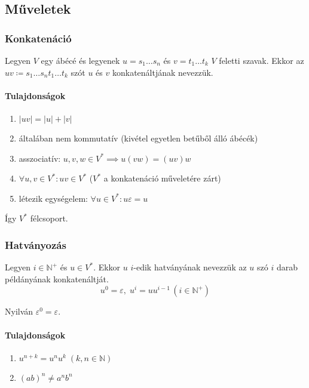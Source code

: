 \subsection{Műveletek}
\subsubsection{Konkatenáció}
\begin{definition*}
	Legyen $V$ egy ábécé és legyenek $ u = s_1 \dots s_n $ és $ v = t_1 \dots t_k $ $V$ feletti szavak. Ekkor az $uv \coloneq s_1 \dots s_n t_1 \dots t_k $ szót $u$ és $v$ konkatenáltjának nevezzük.
\end{definition*}
\paragraph{Tulajdonságok}
\begin{enumerate}
	\item{$ \left| uv \right| = \left| u \right| + \left| v \right| $}
	\item általában nem kommutatív (kivétel egyetlen betűből álló ábécék)
	\item asszociatív: $ u,v,w \in V^* \implies u(vw) = (uv)w $
	\item $ \forall u,v \in V^*: uv \in V^* $ ($ V^* $ a konkatenáció műveletére zárt)
	\item létezik egységelem: $ \forall u \in V^*: u\varepsilon = u $
\end{enumerate}
Így $V^*$ félcsoport.

\newpage
\subsubsection{Hatványozás}
\begin{definition*}
	Legyen $ i \in \mathbb{N}^+ $ és $ u \in V^* $. Ekkor $u$ $i$-edik hatványának nevezzük az $u$ szó $i$ darab példányának konkatenáltját.
	\[
	u^0 = \varepsilon, \; u^i = uu^{i-1} \, (i \in \mathbb{N}^+)
	\]
\end{definition*}

\begin{remark}
	Nyilván $\varepsilon^0 = \varepsilon$.
\end{remark}
\paragraph{Tulajdonságok}
\begin{enumerate}
	\item{$u^{n+k} = u^n u^k \; \left( k,n \in \mathbb{N} \right)  $}
	\item{$ (ab)^n \ne a^nb^n $}
\end{enumerate}

